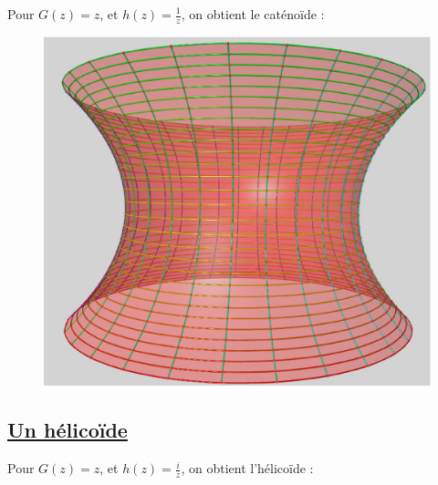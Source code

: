 \documentclass {report}
\begin{document}
Pour $G(z)=z$, et $h(z)=\frac{1}{z}$, on obtient le caténoïde : 

\begin{figure}[h!]
      \centering 
      \includegraphics[scale=0.3]{Images_Fichiers/12.eps}
\end{figure}

\subsection[Un hélicoïde]{\uline{Un hélicoïde}}

Pour $G(z)=z$, et $h(z)=\frac{i}{z}$, on obtient l'hélicoïde : 
\end{document}
